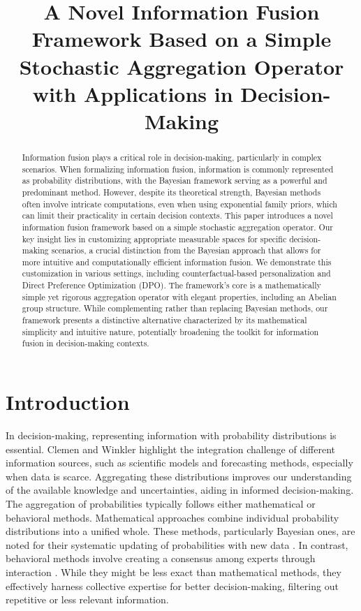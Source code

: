 \documentclass[letterpaper]{article} %
\title{A Novel Information Fusion Framework Based on a Simple Stochastic Aggregation Operator with Applications in Decision-Making}
\theoremstyle{definition}
\theoremstyle{remark}
\begin{document}
\maketitle

\begin{abstract}
Information fusion plays a critical role in decision-making, particularly in complex scenarios. When formalizing information fusion, information is commonly represented as probability distributions, with the Bayesian framework serving as a powerful and predominant method. However, despite its theoretical strength, Bayesian methods often involve intricate computations, even when using exponential family priors, which can limit their practicality in certain decision contexts. This paper introduces a novel information fusion framework based on a simple stochastic aggregation operator. Our key insight lies in customizing appropriate measurable spaces for specific decision-making scenarios, a crucial distinction from the Bayesian approach that allows for more intuitive and computationally efficient information fusion. We demonstrate this customization in various settings, including counterfactual-based personalization and Direct Preference Optimization (DPO). The framework's core is a mathematically simple yet rigorous aggregation operator with elegant properties, including an Abelian group structure. While complementing rather than replacing Bayesian methods, our framework presents a distinctive alternative characterized by its mathematical simplicity and intuitive nature, potentially broadening the toolkit for information fusion in decision-making contexts.

\end{abstract}


\section{Introduction}


In decision-making, representing information with probability distributions is essential. Clemen and Winkler\cite{clemen2007aggregating} highlight the integration challenge of different information sources, such as scientific models and forecasting methods, especially when data is scarce. Aggregating these distributions improves our understanding of the available knowledge and uncertainties, aiding in informed decision-making.  The aggregation of probabilities typically follows either mathematical or behavioral methods. Mathematical approaches combine individual probability distributions into a unified whole. These methods, particularly Bayesian ones, are noted for their systematic updating of probabilities with new data \cite{jouini1996copula,sklar1996random}. In contrast, behavioral methods involve creating a consensus among experts through interaction \cite{ferrell1985combining}. While they might be less exact than mathematical methods, they effectively harness collective expertise for better decision-making, filtering out repetitive or less relevant information. 
\end{document}
